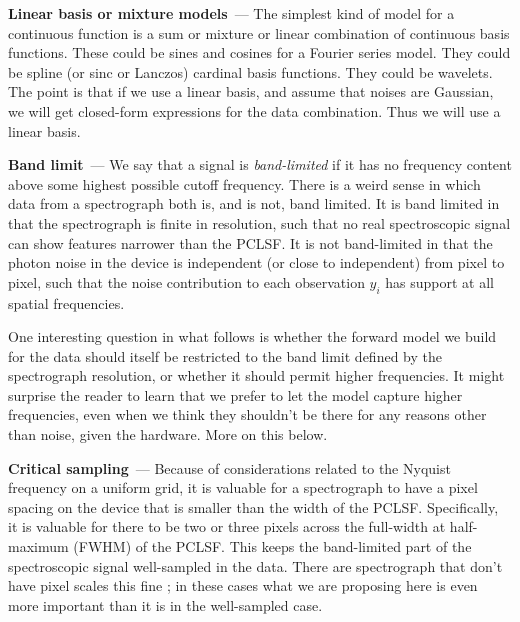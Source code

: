\documentclass[11pt]{article}
\renewcommand{\paragraph}[1]{\medskip\par\noindent\textbf{#1}~---}
\begin{document}
\paragraph{Linear basis or mixture models}
The simplest kind of model for a continuous function is a sum or mixture or linear combination of continuous basis functions.
These could be sines and cosines for a Fourier series model.
They could be spline (or sinc or Lanczos) cardinal basis functions.
They could be wavelets.
The point is that if we use a linear basis, and assume that noises are Gaussian, we will get closed-form expressions for the data combination.
Thus we will use a linear basis.

\paragraph{Band limit}
We say that a signal is \emph{band-limited} if it has no frequency content above some highest possible cutoff frequency.
There is a weird sense in which data from a spectrograph both is, and is not, band limited.
It is band limited in that the spectrograph is finite in resolution, such that no real spectroscopic signal can show features narrower than the PCLSF.
It is not band-limited in that the photon noise in the device is independent (or close to independent) from pixel to pixel, such that the noise contribution to each observation $y_i$ has support at all spatial frequencies.

One interesting question in what follows is whether the forward model we build for the data should itself be restricted to the band limit defined by the spectrograph resolution, or whether it should permit higher frequencies.
It might surprise the reader to learn that we prefer to let the model capture higher frequencies, even when we think they shouldn't be there for any reasons other than noise, given the hardware.
More on this below.

\paragraph{Critical sampling}
Because of considerations related to the Nyquist frequency on a uniform grid, it is valuable for a spectrograph to have a pixel spacing on the device that is smaller than the width of the PCLSF.
Specifically, it is valuable for there to be two or three pixels across the full-width at half-maximum (FWHM) of the PCLSF.
This keeps the band-limited part of the spectroscopic signal well-sampled in the data.
There are spectrograph that don't have pixel scales this fine \cite{apogeehardware}; in these cases what we are proposing here is even more important than it is in the well-sampled case.
\end{document}
